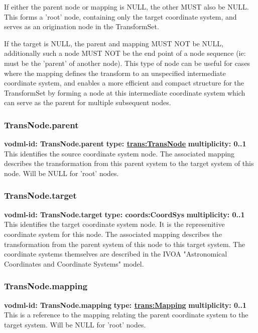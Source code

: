     If either the parent node or mapping is NULL, the other MUST also be NULL. This forms a 'root' node, containing only the target coordinate system, and serves as an origination node in the TransformSet. 

    If the target is NULL, the parent and mapping MUST NOT be NULL, additionally such a node MUST NOT be the end point of a node sequence (ie: must be the 'parent' of another node). This type of node can be useful for cases where the mapping defines the transform to an unspecified intermediate coordinate system, and enables a more efficient and compact structure for the TransformSet by forming a node at this intermediate coordinate system which can serve as the parent for multiple subsequent nodes.

    \subsubsection{TransNode.parent}
      \textbf{vodml-id: TransNode.parent} \newline
      \textbf{type: \hyperref[sect:TransNode]{trans:TransNode}} \newline
      \textbf{multiplicity: 0..1} \newline 
      This identifies the source coordinate system node. The associated mapping describes the transformation from this parent system to the target system of this node. Will be NULL for 'root' nodes.

    \subsubsection{TransNode.target}
      \textbf{vodml-id: TransNode.target} \newline
      \textbf{type: coords:CoordSys} \newline
      \textbf{multiplicity: 0..1} \newline 
      This identifies the target coordinate system node. It is the represenitive coordinate system for this node. The associated mapping describes the transformation from the parent system of this node to this target system. The coordinate systems themselves are described in the IVOA "Astronomical Coordinates and Coordinate Systems" model.

    \subsubsection{TransNode.mapping}
      \textbf{vodml-id: TransNode.mapping} \newline
      \textbf{type: \hyperref[sect:Mapping]{trans:Mapping}} \newline
      \textbf{multiplicity: 0..1} \newline 
      This is a reference to the mapping relating the parent coordinate system to the target system. Will be NULL for 'root' nodes.

